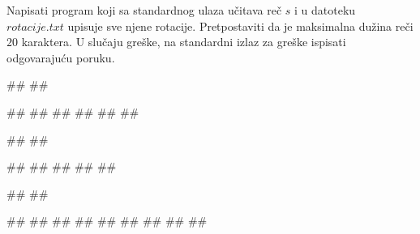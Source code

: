 \begin{Exercise}[label=p3_08] 
 Napisati program koji sa standardnog ulaza učitava reč $s$ i u datoteku $rotacije.txt$
 upisuje sve njene rotacije. Pretpostaviti da je maksimalna dužina reči $20$ karaktera.
U slučaju greške, na standardni izlaz za greške ispisati odgovarajuću poruku.

\begin{minitest}
\begin{upotreba}{1}
#\naslovInt#
##

##
##
##
##
##
##
\end{upotreba}
\end{minitest}
\begin{minitest}
\begin{upotreba}{2}
#\naslovInt#
##

##
##
##
##
##
\end{upotreba}
\end{minitest}
\begin{minitest}
\begin{upotreba}{3}
#\naslovInt#
##

##
##
##
##
##
##
##
##
##
\end{upotreba}
\end{minitest}
\end{Exercise}
\begin{Answer}[ref=p3_08]
\end{Answer}


